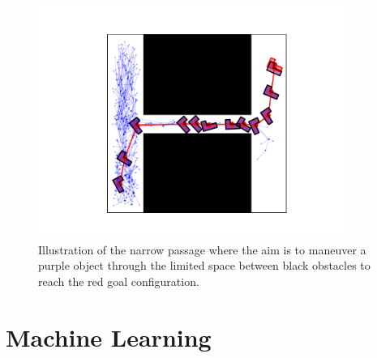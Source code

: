 \documentclass{ctuthesis}
\begin{document}
\begin{figure} 
  \centering 
  \begin{minipage}[t]{0.9\textwidth}
      \centering
      \includegraphics[width=0.9\textwidth]{figChap1/narrow_passage.pdf} 
  \end{minipage} 
  \caption{Illustration of the narrow passage where the aim is to maneuver a purple object through the limited space between black obstacles to reach the red goal configuration.} 
  \label{fig:narrowpassage}
\end{figure}

\section{Machine Learning}
\end{document}
